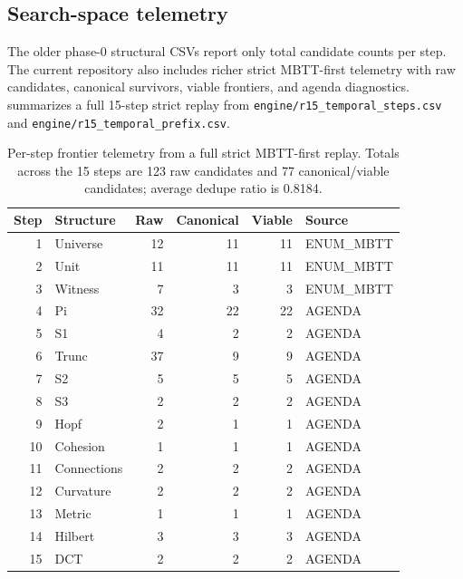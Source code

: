 \documentclass[11pt,a4paper]{article}
\begin{document}
\subsection{Search-space telemetry}

The older phase-0 structural CSVs report only total candidate counts per step. The current repository also includes richer strict MBTT-first telemetry with raw candidates, canonical survivors, viable frontiers, and agenda diagnostics.  summarizes a full 15-step strict replay from \texttt{engine/r15\_temporal\_steps.csv} and \texttt{engine/r15\_temporal\_prefix.csv}.

\begin{table}[p]
\centering
\caption{Per-step frontier telemetry from a full strict MBTT-first replay. Totals across the 15 steps are 123 raw candidates and 77 canonical/viable candidates; average dedupe ratio is 0.8184.}
\label{tab:telemetry}
\small
\begin{tabular}{@{}r l r r r l@{}}
\toprule
Step & Structure & Raw & Canonical & Viable & Source \\
\midrule
1  & Universe    & 12 & 11 & 11 & ENUM\_MBTT \\
2  & Unit        & 11 & 11 & 11 & ENUM\_MBTT \\
3  & Witness     & 7  & 3  & 3  & ENUM\_MBTT \\
4  & Pi          & 32 & 22 & 22 & AGENDA \\
5  & S1          & 4  & 2  & 2  & AGENDA \\
6  & Trunc       & 37 & 9  & 9  & AGENDA \\
7  & S2          & 5  & 5  & 5  & AGENDA \\
8  & S3          & 2  & 2  & 2  & AGENDA \\
9  & Hopf        & 2  & 1  & 1  & AGENDA \\
10 & Cohesion    & 1  & 1  & 1  & AGENDA \\
11 & Connections & 2  & 2  & 2  & AGENDA \\
12 & Curvature   & 2  & 2  & 2  & AGENDA \\
13 & Metric      & 1  & 1  & 1  & AGENDA \\
14 & Hilbert     & 3  & 3  & 3  & AGENDA \\
15 & DCT         & 2  & 2  & 2  & AGENDA \\
\bottomrule
\end{tabular}
\end{table}
\end{document}
